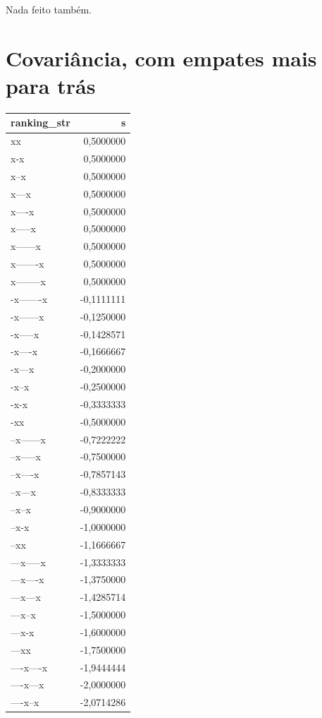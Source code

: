 \documentclass[
  letterpaper,
  DIV=11,
  numbers=noendperiod]{scrreprt}
\begin{document}
Nada feito também.

\section{Covariância, com empates mais para
trás}\label{covariuxe2ncia-com-empates-mais-para-truxe1s}

\begin{longtable*}{lr}
\toprule
ranking\_str & s \\ 
\midrule\addlinespace[2.5pt]
xx & 0,5000000 \\ 
x-x & 0,5000000 \\ 
x--x & 0,5000000 \\ 
x---x & 0,5000000 \\ 
x----x & 0,5000000 \\ 
x-----x & 0,5000000 \\ 
x------x & 0,5000000 \\ 
x-------x & 0,5000000 \\ 
x--------x & 0,5000000 \\ 
-x-------x & -0,1111111 \\ 
-x------x & -0,1250000 \\ 
-x-----x & -0,1428571 \\ 
-x----x & -0,1666667 \\ 
-x---x & -0,2000000 \\ 
-x--x & -0,2500000 \\ 
-x-x & -0,3333333 \\ 
-xx & -0,5000000 \\ 
--x------x & -0,7222222 \\ 
--x-----x & -0,7500000 \\ 
--x----x & -0,7857143 \\ 
--x---x & -0,8333333 \\ 
--x--x & -0,9000000 \\ 
--x-x & -1,0000000 \\ 
--xx & -1,1666667 \\ 
---x-----x & -1,3333333 \\ 
---x----x & -1,3750000 \\ 
---x---x & -1,4285714 \\ 
---x--x & -1,5000000 \\ 
---x-x & -1,6000000 \\ 
---xx & -1,7500000 \\ 
----x----x & -1,9444444 \\ 
----x---x & -2,0000000 \\ 
----x--x & -2,0714286 \\ 

\end{longtable*}
\end{document}
